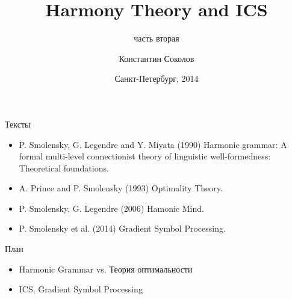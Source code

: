 \documentclass{beamer}
\begin{document}
\title{\Large{Harmony Theory and ICS}}
\subtitle{\small{часть вторая}}
\author{Константин Соколов}
\date{Санкт-Петербург, 2014} 
\begin{frame}
    \thispagestyle{empty}
    \titlepage
\end{frame}

\begin{frame}{Тексты}
\setcounter{framenumber}{1}
\begin{itemize}
    \item P. Smolensky, G. Legendre and Y. Miyata (1990) Harmonic grammar: A formal multi-level connectionist theory of linguistic well-formedness: Theoretical foundations.
    \medskip
    \item A. Prince and P. Smolensky (1993) Optimality Theory.
    \medskip
	\item P. Smolensky, G. Legendre (2006) Hamonic Mind.
    \medskip
    \item P. Smolensky et al. (2014) Gradient Symbol Processing.
\end{itemize}
\end{frame}

\begin{frame}{План}
    \begin{itemize}
        \item Harmonic Grammar vs. Теория оптимальности
        \medskip
        \item ICS, Gradient Symbol Processing
    \end{itemize}
\end{frame}

\end{document}

